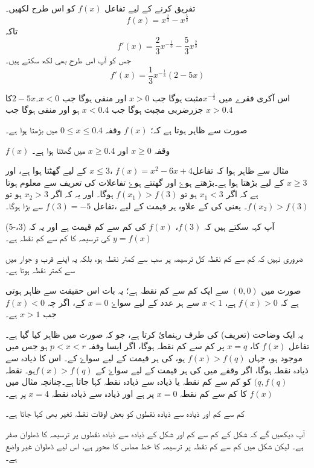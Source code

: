 تفریق کرنے کے لیے تفاعل   \(f(x)\) کو اس طرح لکھیں۔
\[f(x)=x^{\frac{2}{3}}-x^{\frac{5}{3}}\]
تاکہ \[f'(x)=\frac{2}{3}x^{-\frac{1}{3}}-\frac{5}{3}x^{\frac{2}{3}}\]
جس کو آپ اس طرح بھی لکھ سکتے ہیں۔\[f'(x)=\frac{1}{3}x^{-\frac{1}{3}}(2-5x)\]

اس آکری فقرے میں \(x^{-\frac{1}{3}}\)مثبت ہوگا جب \(x>0\) اور منفی ہوگا جب \(x<0\)۔\(2-5x\)کا جزرضربی مچبت ہوگا جب \(x<0.4\) ہو اور منفی ہوگا جب \(x>0.4\)
 
صورت   سے ظاہر ہوتا ہے کہ؛
\(f(x)\)
وقفہ \(0 \leq x \leq 0.4\) میں بڑھتا ہوا ہے۔

\(f(x)\)
وقفہ \(x \geq 0\) اور \(x \geq 0.4\) میں گھٹتا ہوا ہے۔


مثال سے ظاہر ہوا کہ تفاعل\(f(x)=x^2-6x+4\) ،\(x \leq 3\) کے لیے گھٹتا ہوا ہے، اور  \(x \geq 3\) کے لیے بڑھتا ہوا ہے۔بڑھتے ہوۓ اور گھتتے ہوۓ تفاعلات کی تعریف سے معلوم ہوتا ہے کہ اگر \(x_1 <3\) ہو تو \(f(x_1) >f(3)\) ہوگا۔ اور یہ کہ اگر \(x_2 >3\) ہو تو \(f(x_2) >f(3)\)۔ یعنی    کی   کے علاوہ ہر قیمت کے لیے ،تفاعل \(f(3)=-5\) سے بڑا ہوگا۔

آپ کہہ سکتے ہیں کہ \(f(3)\)، \(f(x)\) کی کم سے کم قیمت ہے اور یہ کہ (3،-5)\(y=f(x)\) کی ترسیمہ کا کم سے کم نقطہ ہے۔

ضروری نہیں کہ کم سے کم نقطہ کل ترسیمہ پر سب سے کمتر نقطہ ہو، بلکہ یہ اپنے قرب و جوار میں سے کمتر نقطہ ہوتا ہے۔

صورت  میں \( (0,0)\) سے ایک کم سے کم نقطہ ہے؛ یہ بات اس حقیقت سے ظاہر ہوتی ہے کہ   \(f(x)>0\) ہے، \(x<1\) سے ہر عدد کے لیے سواۓ \(x=0\) کے، اگر چہ \(f(x)<0\) جب \(x>1\) ہے۔

یہ ایک وضاحت (تعریف) کی طرف رہنمائ کرتا ہے، جو کہ صورت   میں ظاہر کیا گیا ہے۔
تفاعل  \(f(x)\)  کا،  \(x = q \) پر کم سے کم نقطہ ہوگا، اگر ایسا وقفہ  \(p <x <r \) ہو جس میں       موجود ہو، جہاں   \( f(x) > f(q) \) ہو،  کی ہر قیمت کے لیے سواۓ   کے۔
اس کا ذیادہ سے ذیادہ نقطہ ہوگا، اگر وقفے میں         کی ہر قیمت کے لیے سواۓ      کے \( f(x)>f(q) \)ہو۔ نقطہ    \( (q,f(q) \)   کو کم سے کم نقطہ یا ذیادہ سے ذیادہ نقطہ کہا جاتا ہے۔چنانچہ مثال      میں   \(f(x)\)  کا کم سے کم نقطہ \(x=0\)      پر ہے اور ذیادہ سے ذیادہ  نقطہ  \(x=4\)    پر ہے۔

کم سے کم اور ذیادہ سے ذیادہ نقطوں کو بعض اوقات نقطہ تغیر بھی کہا جاتا ہے۔

آپ دیکھیں گے کہ  شکل      کے کم سے کم اور شکل     کے ذیادہ سے ذیادہ نقطوں پر ترسیمہ کا ڈھلوان صفر ہے۔ لیکن شکل       میں کم سے کم نقطہ    پر ترسیمہ کا خط مماس  کا محور ہے، اس لیے ڈھلوان غیر واضع ہے۔

